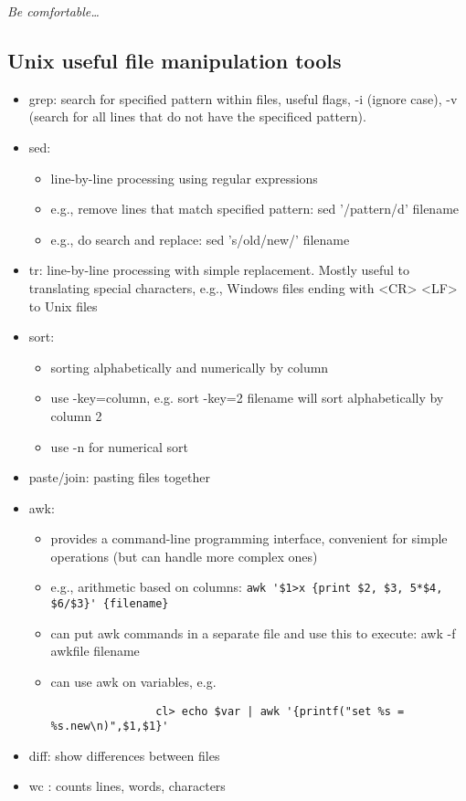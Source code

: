 \documentclass{article}
\newcommand{\test}[1]{%
    \begin{center}
        \colorbox{hl}{\parbox{0.9\textwidth}{\emph{#1}}}
    \end{center}}
\begin{document}
\test{Be comfortable\ldots}

\subsection{Unix useful file manipulation tools}
\begin{itemize}
    \item grep: search for
        specified pattern within files, useful flags, -i (ignore case), -v
        (search for all lines that do not have the specificed
        pattern).
    \item sed:
        \begin{itemize}
            \item line-by-line processing using regular expressions
            \item e.g., remove lines
                that match specified pattern: sed '/{pattern}/d' {filename}
            \item e.g., do
                search and replace:
                sed 's/{old}/{new}/' {filename}
        \end{itemize}
    \item tr: line-by-line
        processing with simple replacement. Mostly useful to translating
        special characters, e.g., Windows files ending with <CR> <LF> to Unix
        files
    \item sort:
        \begin{itemize}
            \item sorting alphabetically and numerically by column
            \item use -key=column, e.g. sort -key=2 {filename} will sort alphabetically by
                column 2
            \item use -n for numerical sort
        \end{itemize}
    \item paste/join: pasting files together
    \item awk:
        \begin{itemize}
            \item provides a command-line programming interface, convenient for
                simple operations (but can handle more complex ones)
            \item e.g., arithmetic
                based on columns:
                \verb|awk '$1>x {print $2, $3, 5*$4, $6/$3}' {filename}|
            \item can put awk commands in a separate file and use this to execute: awk
                -f {awkfile} {filename}
            \item can use awk on variables, e.g.
                \begin{verbatim}
                cl> echo $var | awk '{printf("set %s = %s.new\n)",$1,$1}'
                \end{verbatim}
        \end{itemize}
    \item diff: show differences between files
    \item wc : counts lines, words, characters
\end{itemize}
\end{document}
